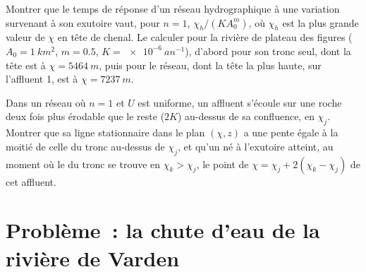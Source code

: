 \begin{exercise}[$\star\star\star$]\label{exo:b3:quantitative-geomorphology:11}
Montrer que le temps de réponse d'un réseau hydrographique à une variation
survenant à son exutoire vaut, pour $n = 1$, $\chi_h/(K A_0^m)$, où $\chi_h$ est la plus grande valeur
de $\chi$ en tête de chenal. Le calculer pour la rivière de plateau des figures
($A_0 = \qty{1}{km^2}$, $m = 0.5$, $K = \qty{e-6}{an^{-1}}$), d'abord pour son
tronc seul, dont la tête est à $\chi = \qty{5464}{m}$, puis pour le réseau,
dont la tête la plus haute, sur l'affluent 1, est à $\chi = \qty{7237}{m}$.
\end{exercise}

\begin{exercise}[$\star\star\star$]\label{exo:b3:quantitative-geomorphology:12}
Dans un réseau où $n = 1$ et $U$ est uniforme, un affluent s'écoule sur une roche deux
fois plus érodable que le reste ($2K$) au-dessus de sa confluence, en $\chi_j$. Montrer que
sa ligne stationnaire dans le plan $(\chi, z)$ a une pente égale à la moitié de celle du
tronc au-dessus de $\chi_j$, et qu'un  né à l'exutoire atteint, au moment où
le  du tronc se trouve en $\chi_k > \chi_j$, le point
de $\chi = \chi_j + 2(\chi_k - \chi_j)$ de cet affluent.
\end{exercise}

\section{Problème~: la chute d'eau de la rivière de Varden}

